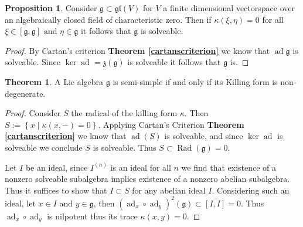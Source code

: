 \documentclass[10.5pt]{article}
\theoremstyle{definition}
\newtheorem{proposition}{Proposition}
\newtheorem{theorem}{Theorem}
\numberwithin{example}{subsection}
\numberwithin{proposition}{subsection}
\numberwithin{pb}{subsection}
\newcommand{\set}[1]{\left\{#1\right\}}
\newcommand{\tand}{\text{ and }}
\begin{document}
        \begin{proposition}
            Consider \(\mathfrak{g} \subset \mathfrak{gl}(V)\) for \(V\) a finite dimensional vectorspace over an algebraically closed field of characteristic zero. Then if \(\kappa(\xi,\eta) = 0\) for all \(\xi \in [\mathfrak{g},\mathfrak{g}] \tand \eta \in \mathfrak{g}\) it follows that \(\mathfrak{g}\) is solveable.

            \begin{proof}
                By Cartan's criterion \textbf{Theorem \ref{cartanscriterion}} we know that \(\operatorname{ad} \mathfrak{g}\) is solveable. Since \(\ker \operatorname{ad} = \mathfrak{z}(\mathfrak{g})\) is solveable it follows that \(\mathfrak{g}\) is.
            \end{proof}
        \end{proposition}

        \begin{theorem}
            A Lie algebra \(\mathfrak{g}\) is semi-simple if and only if its Killing form is non-degenerate.

            \begin{proof}
                Consider \(S\) the radical of the killing form \(\kappa\). Then \(S := \set{x \mid \kappa(x,-) = 0}\). Applying Cartan's Criterion \textbf{Theorem \ref{cartanscriterion}} we know that \(\operatorname{ad}(S)\) is solveable, and since \(\ker \operatorname{ad}\) is solveable we conclude \(S\) is solveable. Thus \(S \subset \operatorname{Rad}(\mathfrak{g}) = 0\).

                Let \(I\) be an ideal, since \(I^{(n)}\) is an ideal for all \(n\) we find that existence of a nonzero solveable subalgebra implies existence of a nonzero abelian subalgebra. Thus it suffices to show that \(I \subset S\) for any abelian ideal \(I\). Considering such an ideal, let \(x \in I\) and \(y \in \mathfrak{g}\), then \((\operatorname{ad}_x \circ \operatorname{ad}_y)^2(\mathfrak{g}) \subset [I,I] = 0\). Thus \(\operatorname{ad}_x \circ \operatorname{ad}_y\) is nilpotent thus its trace \(\kappa(x,y) = 0\).
            \end{proof}
        \end{theorem}
\end{document}
